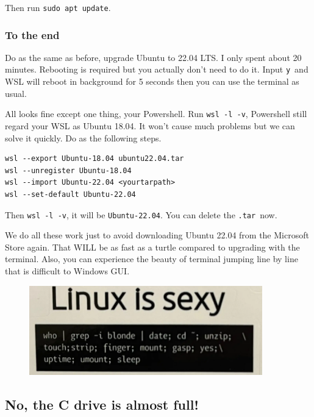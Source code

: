 \documentclass[12pt]{ctexart}
\begin{document}
Then run \texttt{sudo\ apt\ update}.

\subsubsection{\textbf{To the end}}

Do as the same as before, upgrade Ubuntu to 22.04 LTS. I only spent
about 20 minutes. Rebooting is required but you actually
don't need to do it. Input \texttt{y}\ and WSL will
reboot in background for 5 seconds then you can use the terminal as
usual.

All looks fine except one thing, your Powershell. Run
\texttt{wsl\ -l\ -v}, Powershell still regard your WSL as Ubuntu 18.04.
It won't cause much problems but we can solve it
quickly. Do as the following steps.

\begin{adjustwidth}{2em}{0pt}
\begin{verbatim}
wsl --export Ubuntu-18.04 ubuntu22.04.tar
wsl --unregister Ubuntu-18.04
wsl --import Ubuntu-22.04 <yourtarpath>
wsl --set-default Ubuntu-22.04
\end{verbatim}
\end{adjustwidth}

Then \texttt{wsl\ -l\ -v}, it will be \texttt{Ubuntu-22.04}. You can
delete the \texttt{.tar}\ now.

We do all these work just to avoid downloading Ubuntu 22.04 from the
Microsoft Store again. That WILL be as fast as a turtle compared to
upgrading with the terminal. Also, you can experience the beauty of
terminal jumping line by line that is difficult to Windows GUI.

\begin{figure}[H]
    \centering
    \includegraphics[width=0.9\textwidth,keepaspectratio]{assets/Linux/2.3 I upgraded alone/6.png}
\end{figure}

\newpage
\subsection{\textbf{No, the C drive is almost full!}}
\end{document}
